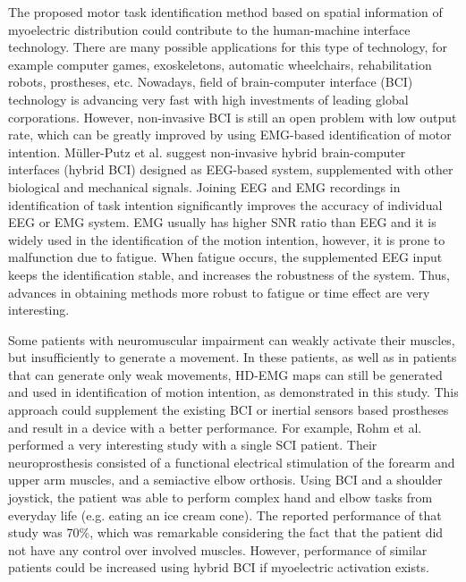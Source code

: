 The proposed motor task identification method based on spatial information of myoelectric distribution could contribute to the human-machine interface technology. There are many possible applications for this type of technology, for example computer games, exoskeletons, automatic wheelchairs, rehabilitation robots, prostheses, etc. Nowadays, field of brain-computer interface (BCI) technology is advancing very fast with high investments of leading global corporations. However, non-invasive BCI is still an open problem with low output rate, which can be greatly improved by using EMG-based identification of motor intention. 
Müller-Putz et al. \citep{Muller-Putz2015} suggest non-invasive hybrid brain-computer interfaces (hybrid BCI) designed as EEG-based system, supplemented with other biological and mechanical signals. Joining EEG and EMG recordings in identification of task intention significantly improves the accuracy of individual EEG or EMG system. EMG usually has higher SNR ratio than EEG and it is widely used in the identification of the motion intention, however, it is prone to malfunction due to fatigue. When fatigue occurs, the supplemented EEG input keeps the identification stable, and increases the robustness of the system. Thus, advances in obtaining methods more robust to fatigue or time effect are very interesting.

Some patients with neuromuscular impairment can weakly activate their muscles, but insufficiently to generate a movement. In these patients, as well as in patients that can generate only weak movements, HD-EMG maps can still be generated and used in identification of motion intention, as demonstrated in this study. This approach could supplement the existing BCI or inertial sensors based prostheses and result in a device with a better performance. For example, Rohm et al. \citep{Rohm2013} performed a very interesting study with a single SCI patient. Their neuroprosthesis consisted of a functional electrical stimulation of the forearm and upper arm muscles, and a semiactive elbow orthosis. Using BCI and a shoulder joystick, the patient was able to perform complex hand and elbow tasks from everyday life (e.g. eating an ice cream cone). The reported performance of that study was 70\%, which was remarkable considering the fact that the patient did not have any control over involved muscles. However, performance of similar patients could be increased using hybrid BCI if myoelectric activation exists.


